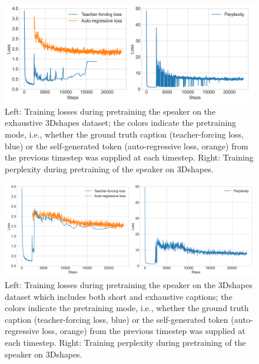 \begin{figure}
	\centering
	\includegraphics[width=\linewidth]{images/3dshapes_pretraining_losses_ppls.png}
	\caption{Left: Training losses during pretraining the speaker on the exhaustive 3Dshapes dataset; the colors indicate the pretraining mode, i.e., whether the ground truth caption (teacher-forcing loss, blue) or the self-generated token (auto-regressive loss, orange) from the previous timestep was supplied at each timestep. Right: Training perplexity during pretraining of the speaker on 3Dshapes.}
	\label{fig:3dshapes_pretraining}
\end{figure}  

\begin{figure}
	\centering
	\includegraphics[width=\linewidth]{images/3dshapes_wShort_pretraining_losses_ppls.png}
	\caption{Left: Training losses during pretraining the speaker on the 3Dshapes dataset which includes both short and exhaustive captions; the colors indicate the pretraining mode, i.e., whether the ground truth caption (teacher-forcing loss, blue) or the self-generated token (auto-regressive loss, orange) from the previous timestep was supplied at each timestep. Right: Training perplexity during pretraining of the speaker on 3Dshapes.}
	\label{fig:3dshapes_pretraining_wShort}
\end{figure}  

